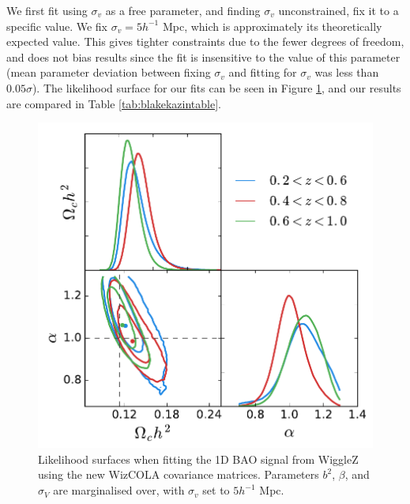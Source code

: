 \documentclass[iop,twocolappendix]{emulateapj}
\begin{document}
We first fit using $\sigma_v$ as a free parameter, and finding $\sigma_v$ unconstrained, fix it to a specific value. We fix $\sigma_v = 5 h^{-1}$ Mpc, which is approximately its theoretically expected value.  This gives tighter constraints due to the fewer degrees of freedom, and does not bias results since the fit is insensitive to the value of this parameter (mean parameter deviation between fixing $\sigma_v$ and fitting for $\sigma_v$ was less than $0.05\sigma$). The likelihood surface for our fits can be seen in Figure \ref{fig:fmonopole}, and our results are compared in Table \ref{tab:blakekazintable}. 


\begin{figure}
	\begin{center}
		\includegraphics[width=\columnwidth]{images/fMonpole.pdf}
	\end{center}
	\caption{Likelihood surfaces when fitting the 1D BAO signal from WiggleZ using the new WizCOLA covariance matrices. Parameters $b^2$, $\beta$, and $\sigma_V$ are marginalised over, with $\sigma_v$ set to $5 h^{-1}$ Mpc.}
	\label{fig:fmonopole}
\end{figure}
\end{document}
